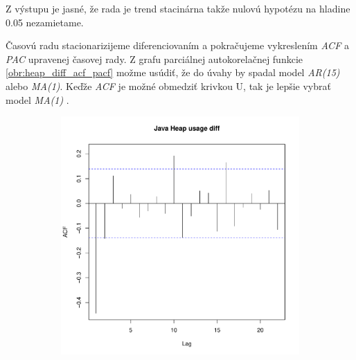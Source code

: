 \documentclass[12pt,a4paper,oneside,final]{article}
\theoremstyle{definition}
\theoremstyle{remark}
\numberwithin{equation}{section}
\begin{document}
Z výstupu je jasné, že rada je trend stacinárna takže nulovú hypotézu na hladine 0.05
nezamietame.

Časovú radu stacionarizijeme diferenciovaním a pokračujeme vykreslením \emph{ACF} a
\emph{PAC} upravenej časovej rady. Z grafu parciálnej autokorelačnej funkcie 
\ref{obr:heap_diff_acf_pacf} možme usúdiť, že do úvahy by 
spadal model \emph{AR(15)} alebo \emph{MA(1)}. Keďže \emph{ACF} je
možné obmedziť krivkou U, tak je lepšie vybrať model \emph{MA(1)} \cite{cipra}.

\begin{figure}[H] \centering
    \begin{subfigure}[b]{0.45\textwidth}
        \centering
        \includegraphics[width=1\linewidth]{images/heap_diff_acf.pdf}
    \end{subfigure}
    \begin{subfigure}[b]{0.45\textwidth}
        \centering

\end{subfigure}
\end{figure}
\end{document}

